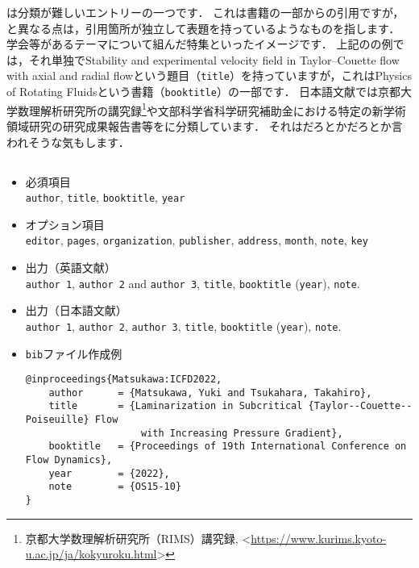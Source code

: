 \documentclass[a4paper,fleqn,uplatex,dvipdfmx]{jsarticle}
\begin{document}
\ttincollection は分類が難しいエントリーの一つです．
これは書籍の一部からの引用ですが，\ttinbook と異なる点は，引用箇所が独立して表題を持っているようなものを指します．
学会等があるテーマについて組んだ特集といったイメージです．
上記の\citet{Lueptow:Springer2000}の例では，それ単独でStability and experimental velocity field in Taylor--Couette flow with axial and radial flowという題目（\verb|title|）を持っていますが，これはPhysics of Rotating Fluidsという書籍（\verb|booktitle|）の一部です．
日本語文献では京都大学数理解析研究所の講究録\footnote{京都大学数理解析研究所（RIMS）講究録, \textless\url{https://www.kurims.kyoto-u.ac.jp/ja/kokyuroku.html}\textgreater}や文部科学省科学研究補助金における特定の新学術領域研究の研究成果報告書等を\ttincollection に分類しています．
それは\ttinproceedings だろとか\tttechreport だろとか言われそうな気もします．

\subsection{\ttinproceedings}
\label{ssec:inproceedings}
\begin{screen}
    \begin{itemize}
        \item 必須項目 \\
        \verb|author|, \verb|title|, \verb|booktitle|, \verb|year|
        \item オプション項目 \\
        \verb|editor|, \verb|pages|, \verb|organization|, \verb|publisher|, \verb|address|, \verb|month|, \verb|note|, \verb|key|
        \item 出力（英語文献） \\
            \colorbox[gray]{0.8}{\texttt{author 1}}, \colorbox[gray]{0.8}{\texttt{author 2}} and \colorbox[gray]{0.8}{\texttt{author 3}}, \colorbox[gray]{0.8}{\texttt{title}}, \colorbox[gray]{0.8}{\texttt{booktitle}} (\colorbox[gray]{0.8}{\texttt{year}}), \colorbox[gray]{0.8}{\texttt{note}}.
        \item 出力（日本語文献） \\
            \colorbox[gray]{0.8}{\texttt{author 1}}, \colorbox[gray]{0.8}{\texttt{author 2}}, \colorbox[gray]{0.8}{\texttt{author 3}}, \colorbox[gray]{0.8}{\texttt{title}}, \colorbox[gray]{0.8}{\texttt{booktitle}} (\colorbox[gray]{0.8}{\texttt{year}}), \colorbox[gray]{0.8}{\texttt{note}}.
        \item \verb|bib|ファイル作成例 \vspace{-3mm}
\begin{verbatim}
@inproceedings{Matsukawa:ICFD2022,
    author      = {Matsukawa, Yuki and Tsukahara, Takahiro},
    title       = {Laminarization in Subcritical {Taylor--Couette--Poiseuille} Flow 
                    with Increasing Pressure Gradient},
    booktitle   = {Proceedings of 19th International Conference on Flow Dynamics},
    year        = {2022},
    note        = {OS15-10}
}
\end{verbatim}
    \end{itemize}
\end{screen}
\end{document}
